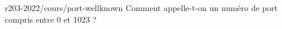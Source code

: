 \begin{question}{r203-2022/cours/port-wellknown}
  Comment appelle-t-on un numéro de port compris entre 0 et 1023 ?
  \begin{reponses}
  \end{reponses}
\end{question}
